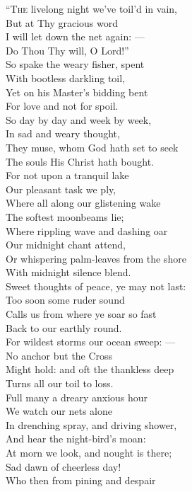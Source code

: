 “\textsc{The} livelong night we’ve toil’d in vain, \\
 But at Thy gracious word \\
 I will let down the net again: — \\
 Do Thou Thy will, O Lord!” \\
  So spake the weary fisher, spent \\
 With bootless darkling toil, \\
 Yet on his Master’s bidding bent \\
 For love and not for spoil. \\
  So day by day and week by week, \\
 In sad and weary thought, \\
 They muse, whom God hath set to seek \\
 The souls His Christ hath bought. \\
  For not upon a tranquil lake \\
 Our pleasant task we ply, \\
 Where all along our glistening wake \\
 The softest moonbeams lie; \\
  Where rippling wave and dashing oar \\
 Our midnight chant attend, \\
 Or whispering palm-leaves from the shore \\
 With midnight silence blend. \\
  Sweet thoughts of peace, ye may not last: \\
 Too soon some ruder sound \\
 Calls us from where ye soar so fast \\
 Back to our earthly round. \\
  For wildest storms our ocean sweep: — \\
 No anchor but the Cross \\
 Might hold: and oft the thankless deep \\
 Turns all our toil to loss. \\
  Full many a dreary anxious hour \\
 We watch our nets alone \\
 In drenching spray, and driving shower, \\
 And hear the night-bird’s moan: \\
  At morn we look, and nought is there; \\
 Sad dawn of cheerless day! \\
 Who then from pining and despair \\
